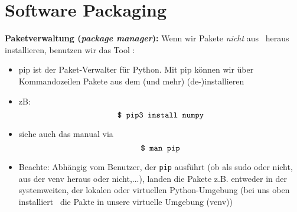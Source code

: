 \section{Software Packaging}

\textbf{Paketverwaltung (\textit{package manager}):}  Wenn wir Pakete \textit{nicht} aus \pycharm~heraus installieren, benutzen wir das Tool :
\begin{itemize}
	\item pip ist der Paket-Verwalter für Python. Mit pip können wir über Kommandozeilen Pakete aus dem  (und mehr) (de-)installieren
	\item zB: $$\texttt{\$ pip3 install numpy}$$
	\item siehe auch das manual via $$\texttt{\$ man pip}$$
	\item Beachte: Abhängig vom Benutzer, der \texttt{pip} ausführt (ob als sudo oder nicht, aus der venv heraus oder nicht,...), landen die Pakete z.B. entweder in der systemweiten, der lokalen oder virtuellen Python-Umgebung (bei uns oben installiert \pycharm~die Pakte in unsere virtuelle Umgebung (venv))
\end{itemize}